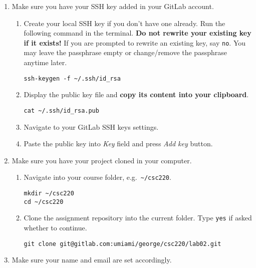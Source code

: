 \begin{enumerate}
\def\labelenumi{\arabic{enumi}.}
\item
  Make sure you have your SSH key added in your GitLab account.

  \begin{enumerate}
  \def\labelenumii{\arabic{enumii}.}
  \item
    Create your local SSH key if you don't have one already. Run the following command in the terminal. \textbf{Do not rewrite your existing key if it exists!} If you are prompted to rewrite an existing key, say \texttt{no}. You may leave the passphrase empty or change/remove the passphrase anytime later.
\begin{verbatim}
ssh-keygen -f ~/.ssh/id_rsa
\end{verbatim}
  \item
    Display the public key file and \textbf{copy its content into your clipboard}.
\begin{verbatim}
cat ~/.ssh/id_rsa.pub
\end{verbatim}
  \item
    Navigate to your GitLab SSH keys settings.
  \item
    Paste the public key into \emph{Key} field and press \emph{Add key} button.
  \end{enumerate}
\item
  Make sure you have your project cloned in your computer.

  \begin{enumerate}
  \def\labelenumii{\arabic{enumii}.}
  \item
    Navigate into your course folder, e.g.~\texttt{\textasciitilde{}/csc220}.
\begin{verbatim}
mkdir ~/csc220
cd ~/csc220
\end{verbatim}
  \item
    Clone the assignment repository into the current folder. Type \texttt{yes} if asked whether to continue.
\begin{verbatim}
git clone git@gitlab.com:umiami/george/csc220/lab02.git
\end{verbatim}
  \end{enumerate}
\item
  Make sure your name and email are set accordingly.


\end{enumerate}
